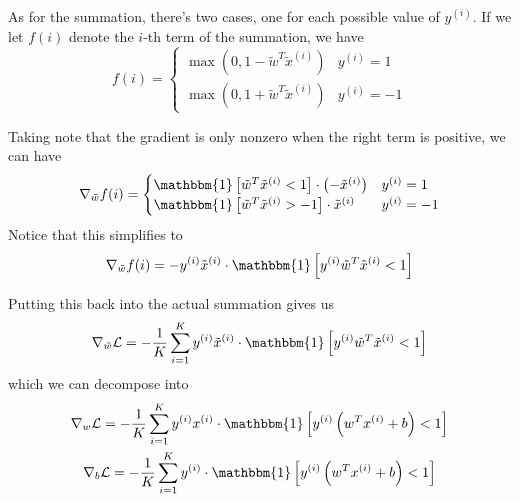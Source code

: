 \documentclass[12pt]{article}
\begin{document}
As for the summation, there's two cases, one for each possible value of $y^{(i)}$.
If we let $f(i)$ denote the $i$-th term of the summation, we have
\[f(i)=\begin{cases}
      \max\left(0, 1-\tilde{w}^T\tilde{x}^{(i)}\right) & y^{(i)}=1 \\
      \max\left(0, 1+\tilde{w}^T\tilde{x}^{(i)}\right) & y^{(i)}=-1
\end{cases}\]

Taking note that the gradient is only nonzero when the right term is positive, we can have
\[\nabla_{\tilde{w}} f(i)=\begin{cases}
      \mathbbm{1}\left[\tilde{w}^T\tilde{x}^{(i)}<1\right] \cdot \left(-\tilde{x}^{(i)}\right) & y^{(i)}=1 \\
      \mathbbm{1}\left[\tilde{w}^T\tilde{x}^{(i)}>-1\right] \cdot \tilde{x}^{(i)} & y^{(i)}=-1
\end{cases}\]
Notice that this simplifies to
\[\nabla_{\tilde{w}} f(i)=-y^{(i)}\tilde{x}^{(i)} \cdot \mathbbm{1}\left[y^{(i)}\tilde{w}^T\tilde{x}^{(i)}<1\right] \]

Putting this back into the actual summation gives us
\[\nabla_{\tilde{w}} \mathcal{L}=-\frac{1}{K} \sum_{i=1}^{K} y^{(i)}\tilde{x}^{(i)} \cdot \mathbbm{1}\left[y^{(i)}\tilde{w}^T\tilde{x}^{(i)}<1\right]\]
which we can decompose into
\begin{gather*}
      \nabla_{w} \mathcal{L}=-\frac{1}{K} \sum_{i=1}^{K} y^{(i)}x^{(i)} \cdot \mathbbm{1}\left[y^{(i)}\left(w^Tx^{(i)}+b\right)<1\right] \\
      \nabla_{b} \mathcal{L}=-\frac{1}{K} \sum_{i=1}^{K} y^{(i)} \cdot \mathbbm{1}\left[y^{(i)}\left(w^Tx^{(i)}+b\right)<1\right]
\end{gather*}
\end{document}
